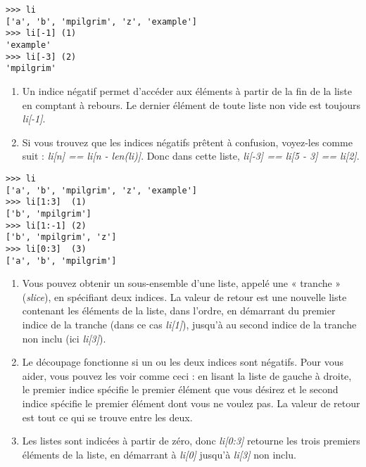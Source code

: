 \begin{example}
\begin{lstlisting}
>>> li
['a', 'b', 'mpilgrim', 'z', 'example']
>>> li[-1] (1)
'example'
>>> li[-3] (2)
'mpilgrim'
\end{lstlisting}
\end{example}

\begin{enumerate}
\item{Un indice négatif permet d'accéder aux éléments à partir de la fin de la liste en comptant à rebours. Le dernier élément de toute liste non vide est toujours \emph{li[-1]}.}
\item{Si vous trouvez que les indices négatifs prêtent à confusion, voyez-les comme suit : \emph{li[n] == li[n - len(li)]}. Donc dans cette liste, \emph{li[-3] == li[5 - 3] == li[2]}.}
\end{enumerate}

\begin{example}
\begin{lstlisting}
>>> li
['a', 'b', 'mpilgrim', 'z', 'example']
>>> li[1:3]  (1)
['b', 'mpilgrim']
>>> li[1:-1] (2)
['b', 'mpilgrim', 'z']
>>> li[0:3]  (3)
['a', 'b', 'mpilgrim']
\end{lstlisting}
\end{example}

\begin{enumerate}
\item{Vous pouvez obtenir un sous-ensemble d'une liste, appelé une « tranche » (\emph{slice}), en spécifiant deux indices. La valeur de retour est une nouvelle liste contenant les éléments de la liste, dans l'ordre, en démarrant du premier indice de la tranche (dans ce cas \emph{li[1]}), jusqu'à au second indice de la tranche non inclu (ici \emph{li[3]}).}
\item{Le découpage fonctionne si un ou les deux indices sont négatifs. Pour vous aider, vous pouvez les voir comme ceci : en lisant la liste de gauche à droite, le premier indice spécifie le premier élément que vous désirez et le second indice spécifie le premier élément dont vous ne voulez pas. La valeur de retour est tout ce qui se trouve entre les deux.}
\item{Les listes sont indicées à partir de zéro, donc \emph{li[0:3]} retourne les trois premiers éléments de la liste, en démarrant à \emph{li[0]} jusqu'à \emph{li[3]} non inclu.}
\end{enumerate}

